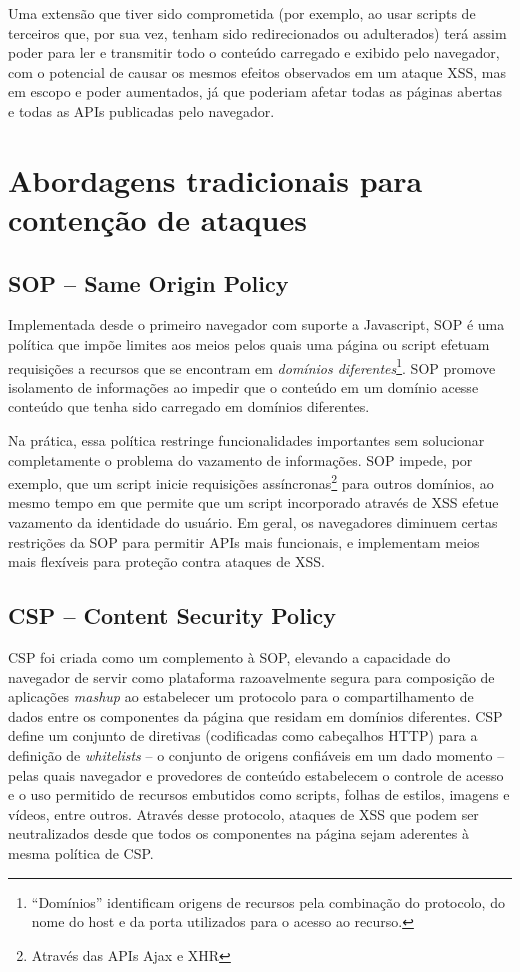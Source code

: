 Uma extensão que tiver sido comprometida (por exemplo, ao usar scripts de terceiros que, por sua vez, tenham sido redirecionados ou adulterados) terá assim poder para ler e transmitir todo o conteúdo carregado e exibido pelo navegador, com o potencial de causar os mesmos efeitos observados em um ataque XSS, mas em escopo e poder aumentados, já que poderiam afetar todas as páginas abertas e todas as APIs publicadas pelo navegador.

\section{Abordagens tradicionais para contenção de ataques}

\subsection{SOP -- Same Origin Policy}
Implementada desde o primeiro navegador com suporte a Javascript, SOP \cite{W3C:SOP} é uma política que impõe limites aos meios pelos quais uma página ou script efetuam requisições a recursos que se encontram em \textit{domínios diferentes}\footnote{``Domínios'' identificam origens de recursos pela combinação do protocolo, do nome do host e da porta utilizados para o acesso ao recurso.}. SOP promove isolamento de informações ao impedir que o conteúdo em um domínio acesse conteúdo que tenha sido carregado em domínios diferentes.

Na prática, essa política restringe funcionalidades importantes sem solucionar completamente o problema do vazamento de informações. SOP impede, por exemplo, que um script inicie requisições assíncronas\footnote{Através das	APIs Ajax e XHR} para outros domínios, ao mesmo tempo em que permite que um script incorporado através de XSS efetue vazamento da identidade do usuário. Em geral, os navegadores diminuem certas restrições da SOP para permitir APIs mais funcionais, e implementam meios mais flexíveis para proteção contra ataques de XSS.

\subsection{CSP -- Content Security Policy}
CSP foi criada como um complemento à SOP, elevando a capacidade do navegador de servir como plataforma razoavelmente segura para composição de aplicações \textit{mashup} ao estabelecer um protocolo para o compartilhamento de dados entre os componentes da página que residam em domínios diferentes. CSP define um conjunto de diretivas (codificadas como cabeçalhos HTTP) para a definição de \textit{whitelists} -- o conjunto de origens confiáveis em um dado momento -- pelas quais navegador e provedores de conteúdo estabelecem o controle de acesso e o uso permitido de recursos embutidos como scripts, folhas de estilos, imagens e vídeos, entre outros. Através desse protocolo, ataques de XSS que podem ser neutralizados desde que todos os componentes na página sejam aderentes à mesma política de CSP.

